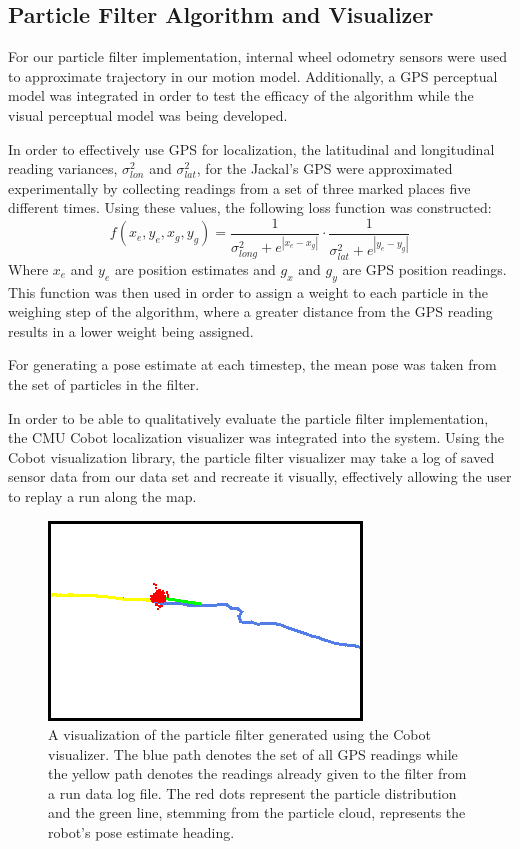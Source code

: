 \documentclass[letterpaper, 12 pt, conference]{ieeeconf}  %
\begin{document}
\subsection{Particle Filter Algorithm and Visualizer}
For our particle filter implementation, internal wheel odometry sensors were used to approximate trajectory in our motion model. Additionally, a GPS perceptual model was integrated in order to test the efficacy of the algorithm while the visual perceptual model was being developed. 
\par
In order to effectively use GPS for localization, the latitudinal and longitudinal reading variances, $\sigma _{lon}^2$ and $\sigma _{lat}^2$, for the Jackal's GPS were approximated experimentally by collecting readings from a set of three marked places five different times. Using these values, the following loss function was constructed:
$$
f(x_e,y_e,x_g,y_g)= \frac{1}{\sigma _{long}^2 + e^{|x_e-x_g|}}\cdot \frac{1}{\sigma _{lat}^2 + e^{|y_e-y_g|}}
$$
Where $x_e$ and $y_e$ are position estimates and $g_x$ and $g_y$ are GPS position readings. This function was then used in order to assign a weight to each particle in the weighing step of the algorithm, where a greater distance from the GPS reading results in a lower weight being assigned.
\par
For generating a pose estimate at each timestep, the mean pose was taken from the set of particles in the filter. 
\par
In order to be able to qualitatively evaluate the particle filter implementation, the CMU Cobot \cite{cobot} localization visualizer was integrated into the system. Using the Cobot visualization library, the particle filter visualizer may take a log of saved sensor data from our data set and recreate it visually, effectively allowing the user to replay a run along the map. 

\begin{figure}[h]
\centering
\includegraphics[scale=0.70]{particle_filter_visual}
\caption{A visualization of the particle filter generated using the Cobot visualizer. The blue path denotes the set of all GPS readings while the yellow path denotes the readings already given to the filter from a run data log file. The red dots represent the particle distribution and the green line, stemming from the particle cloud, represents the robot's pose estimate heading.}
\end{figure}
\end{document}
